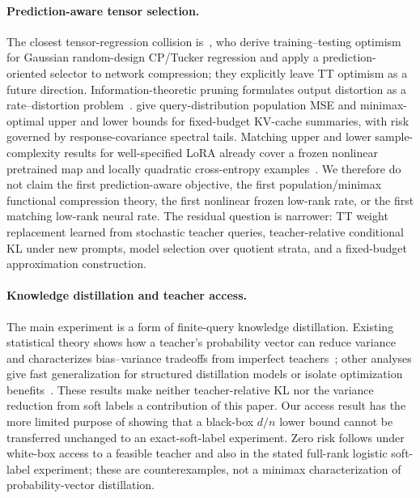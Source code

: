 \paragraph{Prediction-aware tensor selection.}
The closest tensor-regression collision is~\citet{shi2026optimism}, who derive training--testing optimism for Gaussian random-design CP/Tucker regression and apply a prediction-oriented selector to network compression; they explicitly leave TT optimism as a future direction. Information-theoretic pruning formulates output distortion as a rate--distortion problem~\citep{isik2022pruning}. \citet{haverbeck2026kvcache} give query-distribution population MSE and minimax-optimal upper and lower bounds for fixed-budget KV-cache summaries, with risk governed by response-covariance spectral tails. Matching upper and lower sample-complexity results for well-specified LoRA already cover a frozen nonlinear pretrained map and locally quadratic cross-entropy examples~\citep{arunan2026lora}. We therefore do not claim the first prediction-aware objective, the first population/minimax functional compression theory, the first nonlinear frozen low-rank rate, or the first matching low-rank neural rate. The residual question is narrower: TT weight replacement learned from stochastic teacher queries, teacher-relative conditional KL under new prompts, model selection over quotient strata, and a fixed-budget approximation construction.

\paragraph{Knowledge distillation and teacher access.}
The main experiment is a form of finite-query knowledge distillation. Existing statistical theory shows how a teacher's probability vector can reduce variance and characterizes bias--variance tradeoffs from imperfect teachers~\citep{menon2021distillation}; other analyses give fast generalization for structured distillation models or isolate optimization benefits~\citep{phuong2019distillation,xie2026distillation}. These results make neither teacher-relative KL nor the variance reduction from soft labels a contribution of this paper. Our access result has the more limited purpose of showing that a black-box \(d/n\) lower bound cannot be transferred unchanged to an exact-soft-label experiment. Zero risk follows under white-box access to a feasible teacher and also in the stated full-rank logistic soft-label experiment; these are counterexamples, not a minimax characterization of probability-vector distillation.

